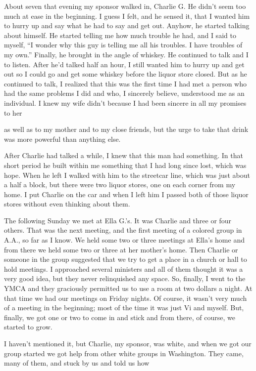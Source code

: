 \begin{biblechapter}
About seven that evening my sponsor walked in, Charlie G. He didn’t seem too much at ease in the beginning. I guess I felt, and he sensed it, that I wanted him to hurry up and say what he had to say and get out. Anyhow, he started talking about himself. He started telling me how much trouble he had, and I said to myself, “I wonder why this guy is telling me all his troubles. I have troubles of my own.” Finally, he brought in the angle of whiskey. He continued to talk and I to listen. After he’d talked half an hour, I still wanted him to hurry up and get out so I could go and get some whiskey before the liquor store closed. But as he continued to talk, I realized that this was the first time I had met a person who had the same problems I did and who, I sincerely believe, understood me as an individual. I knew my wife didn’t because I had been sincere in all my promises to her

as well as to my mother and to my close friends, but the urge to take that drink was more powerful than anything else.

After Charlie had talked a while, I knew that this man had something. In that short period he built within me something that I had long since lost, which was hope. When he left I walked with him to the streetcar line, which was just about a half a block, but there were two liquor stores, one on each corner from my home. I put Charlie on the car and when I left him I passed both of those liquor stores without even thinking about them.

The following Sunday we met at Ella G.’s. It was Charlie and three or four others. That was the next meeting, and the first meeting of a colored group in A.A., so far as I know. We held some two or three meetings at Ella’s home and from there we held some two or three at her mother’s home. Then Charlie or someone in the group suggested that we try to get a place in a church or hall to hold meetings. I approached several ministers and all of them thought it was a very good idea, but they never relinquished any space. So, finally, I went to the YMCA and they graciously permitted us to use a room at two dollars a night. At that time we had our meetings on Friday nights. Of course, it wasn’t very much of a meeting in the beginning; most of the time it was just Vi and myself. But, finally, we got one or two to come in and stick and from there, of course, we started to grow.

I haven’t mentioned it, but Charlie, my sponsor, was white, and when we got our group started we got help from other white groups in Washington. They came, many of them, and stuck by us and told us how


\end{biblechapter}
